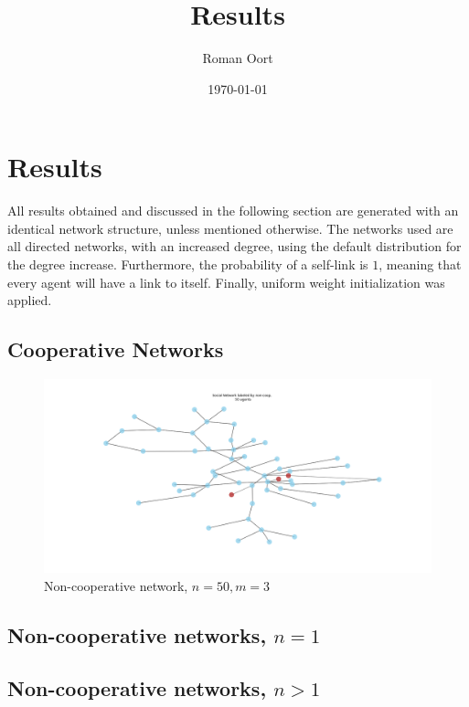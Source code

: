 \documentclass{article}
\title{Results}
\author{Roman Oort}
\date{\today}
\begin{document}
\maketitle

\tableofcontents
\newpage
\section{Results}

All results obtained and discussed in the following section are generated with an identical network structure, unless mentioned otherwise. The networks used are all directed networks, with an increased degree, using the default distribution for the degree increase. Furthermore, the probability of a self-link is $1$, meaning that every agent will have a link to itself. Finally, uniform weight initialization was applied.

\subsection{Cooperative Networks}

\begin{center}
    \begin{figure}[!htbp]
        \centering
        \includegraphics[width=1\textwidth]{ThesisKI/Images/NonCoopGraph.png}
        \caption{Non-cooperative network, $n=50, m=3$}
        \label{network:noncoop}
    \end{figure}
\end{center}

\subsection{Non-cooperative networks, $n=1$}

\subsection{Non-cooperative networks, $n > 1$}
\end{document}
